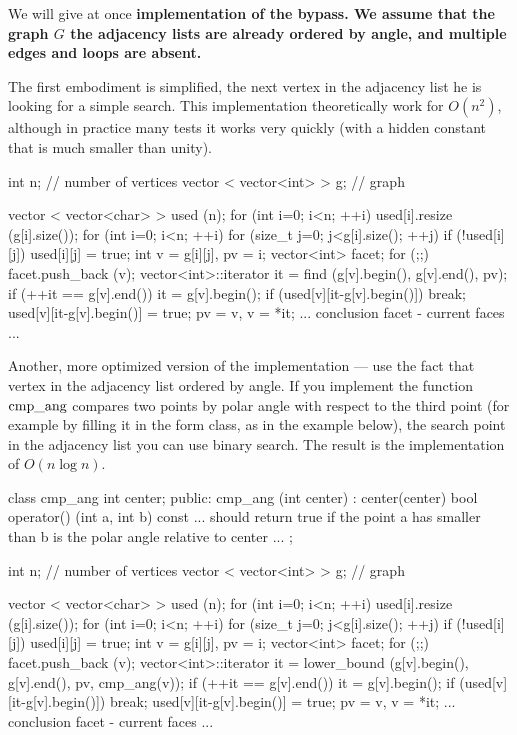 We will give at once \bf{implementation} of the bypass. We assume that the graph $G$ the adjacency lists are already ordered by angle, and multiple edges and loops are absent.

The first embodiment is simplified, the next vertex in the adjacency list he is looking for a simple search. This implementation theoretically work for $O(n^2)$, although in practice many tests it works very quickly (with a hidden constant that is much smaller than unity).

\code
int n; // number of vertices
vector < vector<int> > g; // graph

vector < vector<char> > used (n);
for (int i=0; i<n; ++i)
used[i].resize (g[i].size());
for (int i=0; i<n; ++i)
for (size_t j=0; j<g[i].size(); ++j)
if (!used[i][j]) {
used[i][j] = true;
int v = g[i][j], pv = i;
vector<int> facet;
for (;;) {
facet.push_back (v);
vector<int>::iterator it = find (g[v].begin(), g[v].end(), pv);
if (++it == g[v].end()) it = g[v].begin();
if (used[v][it-g[v].begin()]) break;
used[v][it-g[v].begin()] = true;
pv = v, v = *it;
}
... conclusion facet - current faces ...
}
\endcode

Another, more optimized version of the implementation --- use the fact that vertex in the adjacency list ordered by angle. If you implement the function $\rm cmp\_ang$ compares two points by polar angle with respect to the third point (for example by filling it in the form class, as in the example below), the search point in the adjacency list you can use binary search. The result is the implementation of $O(n \log n)$.

\code
class cmp_ang {
int center;
public:
cmp_ang (int center) : center(center)
{ }
bool operator() (int a, int b) const {
... should return true if the point a has
smaller than b is the polar angle relative to center ...
}
};


int n; // number of vertices
vector < vector<int> > g; // graph

vector < vector<char> > used (n);
for (int i=0; i<n; ++i)
used[i].resize (g[i].size());
for (int i=0; i<n; ++i)
for (size_t j=0; j<g[i].size(); ++j)
if (!used[i][j]) {
used[i][j] = true;
int v = g[i][j], pv = i;
vector<int> facet;
for (;;) {
facet.push_back (v);
vector<int>::iterator it = lower_bound (g[v].begin(), g[v].end(),
pv, cmp_ang(v));
if (++it == g[v].end()) it = g[v].begin();
if (used[v][it-g[v].begin()]) break;
used[v][it-g[v].begin()] = true;
pv = v, v = *it;
}
... conclusion facet - current faces ...
}
\endcode

